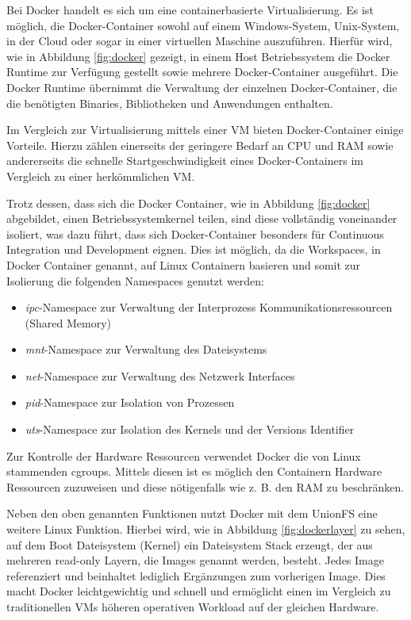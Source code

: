 Bei Docker handelt es sich um eine containerbasierte Virtualisierung.
Es ist möglich, die Docker-Container sowohl auf einem Windows-System, Unix-System, in der Cloud oder sogar in einer virtuellen Maschine auszuführen.
Hierfür wird, wie in Abbildung \ref{fig:docker} gezeigt, in einem Host Betriebssystem die Docker Runtime zur Verfügung gestellt sowie mehrere Docker-Container ausgeführt.
Die Docker Runtime übernimmt die Verwaltung der einzelnen Docker-Container, die die benötigten Binaries, Bibliotheken und Anwendungen enthalten.

Im Vergleich zur Virtualisierung mittels einer \ac{VM} bieten Docker-Container einige Vorteile.
Hierzu zählen einerseits der geringere Bedarf an CPU und RAM sowie andererseits die schnelle Startgeschwindigkeit eines Docker-Containers im Vergleich zu einer herkömmlichen \ac{VM}.

Trotz dessen, dass sich die Docker Container, wie in Abbildung \ref{fig:docker} abgebildet, einen Betriebssystemkernel teilen, sind diese vollständig voneinander isoliert, was dazu führt, dass sich Docker-Container besonders für Continuous Integration und Development eignen.
Dies ist möglich, da die Workspaces, in Docker \glqq{}Container\grqq{} genannt, auf Linux Containern basieren und somit zur Isolierung die folgenden Namespaces genutzt werden:

\begin{itemize}
	\item \textit{ipc}-Namespace zur Verwaltung der Interprozess Kommunikationsressourcen (Shared Memory)
	\item \textit{mnt}-Namespace zur Verwaltung des Dateisystems
	\item \textit{net}-Namespace zur Verwaltung des Netzwerk Interfaces
	\item \textit{pid}-Namespace zur Isolation von Prozessen
	\item \textit{uts}-Namespace zur Isolation des Kernels und der Versions Identifier
\end{itemize}

Zur Kontrolle der Hardware Ressourcen verwendet Docker die von Linux stammenden \ac{cgroups}.
Mittels diesen ist es möglich den Containern Hardware Ressourcen zuzuweisen und diese nötigenfalls wie z. B. den RAM zu beschränken.

Neben den oben genannten Funktionen nutzt Docker mit dem \ac{UnionFS} eine weitere Linux Funktion.
Hierbei wird, wie in Abbildung \ref{fig:dockerlayer} zu sehen, auf dem Boot Dateisystem (Kernel) ein Dateisystem Stack erzeugt, der aus mehreren read-only Layern, die Images genannt werden, besteht.
Jedes Image referenziert und beinhaltet lediglich Ergänzungen zum vorherigen Image.
Dies macht Docker leichtgewichtig und schnell und ermöglicht einen im Vergleich zu traditionellen \acp{VM} höheren operativen Workload auf der gleichen Hardware.

